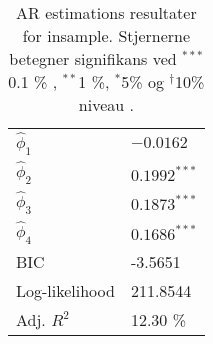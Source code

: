 \begin{table}[h]
\center
\begin{tabular}{ll}
\toprule
$\widehat{\phi}_1$ &$ -0.0162 $ \\
$\widehat{\phi}_2$ & $0.1992^{***}$  \\
$\widehat{\phi}_3$ &$0.1873^{***}$  \\
$\widehat{\phi}_4$ &$0.1686^{***} $ \\ \midrule
BIC & -3.5651 \\
Log-likelihood &  211.8544\\ 
Adj. $R^2$ & 12.30 \% \\ \bottomrule
 \end{tabular}
\caption{AR estimations resultater for insample. Stjernerne betegner signifikans ved $^{***}$0.1 \% , $^{**}$1 \%, $^{*}$5\% og  $^{\dagger}$10\% niveau .} \label{tab:est_ar}
\end{table}